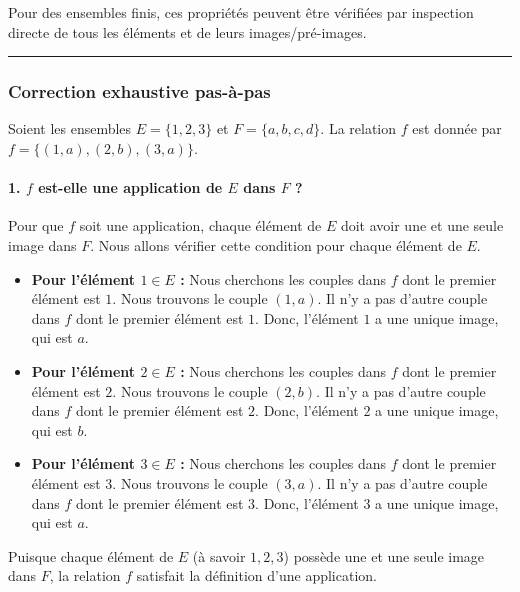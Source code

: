 \documentclass[12pt,a4paper]{report}
\begin{document}
Pour des ensembles finis, ces propriétés peuvent être vérifiées par
inspection directe de tous les éléments et de leurs images/pré-images.

\begin{center}\rule{0.5\linewidth}{0.5pt}\end{center}

\subsubsection{Correction exhaustive
pas-à-pas}\label{correction-exhaustive-pas-uxe0-pas}

Soient les ensembles \(E = \{1, 2, 3\}\) et \(F = \{a, b, c, d\}\). La
relation \(f\) est donnée par \(f = \{(1, a), (2, b), (3, a)\}\).

\paragraph{\texorpdfstring{1. \(f\) est-elle une application de \(E\)
dans \(F\)
?}{1. f est-elle une application de E dans F ?}}\label{f-est-elle-une-application-de-e-dans-f}

Pour que \(f\) soit une application, chaque élément de \(E\) doit avoir
une et une seule image dans \(F\). Nous allons vérifier cette condition
pour chaque élément de \(E\).

\begin{itemize}
\item
  \textbf{Pour l'élément \(1 \in E\) :} Nous cherchons les couples dans
  \(f\) dont le premier élément est \(1\). Nous trouvons le couple
  \((1, a)\). Il n'y a pas d'autre couple dans \(f\) dont le premier
  élément est \(1\). Donc, l'élément \(1\) a une unique image, qui est
  \(a\).
\item
  \textbf{Pour l'élément \(2 \in E\) :} Nous cherchons les couples dans
  \(f\) dont le premier élément est \(2\). Nous trouvons le couple
  \((2, b)\). Il n'y a pas d'autre couple dans \(f\) dont le premier
  élément est \(2\). Donc, l'élément \(2\) a une unique image, qui est
  \(b\).
\item
  \textbf{Pour l'élément \(3 \in E\) :} Nous cherchons les couples dans
  \(f\) dont le premier élément est \(3\). Nous trouvons le couple
  \((3, a)\). Il n'y a pas d'autre couple dans \(f\) dont le premier
  élément est \(3\). Donc, l'élément \(3\) a une unique image, qui est
  \(a\).
\end{itemize}

Puisque chaque élément de \(E\) (à savoir \(1, 2, 3\)) possède une et
une seule image dans \(F\), la relation \(f\) satisfait la définition
d'une application.
\end{document}

